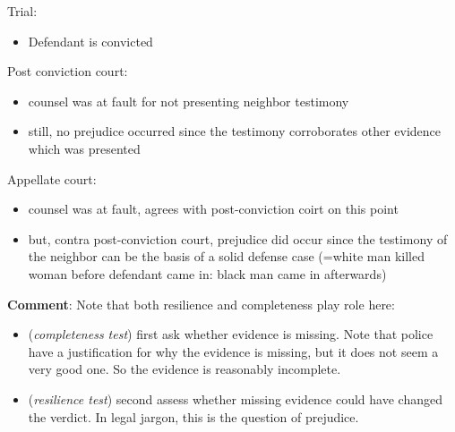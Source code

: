 \documentclass[
  10pt,
  dvipsnames,enabledeprecatedfontcommands]{scrartcl}
\providecommand{\tightlist}{%
  \setlength{\itemsep}{0pt}\setlength{\parskip}{0pt}}
\begin{document}
Trial:

\begin{itemize}
\tightlist
\item
  Defendant is convicted
\end{itemize}

Post conviction court:

\begin{itemize}
\item
  counsel was at fault for not presenting neighbor testimony
\item
  still, no prejudice occurred since the testimony corroborates other
  evidence which was presented
\end{itemize}

Appellate court:

\begin{itemize}
\item
  counsel was at fault, agrees with post-conviction coirt on this point
\item
  but, contra post-conviction court, prejudice did occur since the
  testimony of the neighbor can be the basis of a solid defense case
  (=white man killed woman before defendant came in: black man came in
  afterwards)
\end{itemize}

\textbf{Comment}: Note that both resilience and completeness play role
here:

\begin{itemize}
\item
  (\emph{completeness test}) first ask whether evidence is missing. Note
  that police have a justification for why the evidence is missing, but
  it does not seem a very good one. So the evidence is reasonably
  incomplete.
\item
  (\emph{resilience test}) second assess whether missing evidence could
  have changed the verdict. In legal jargon, this is the question of
  prejudice.
\end{itemize}


\end{document}
